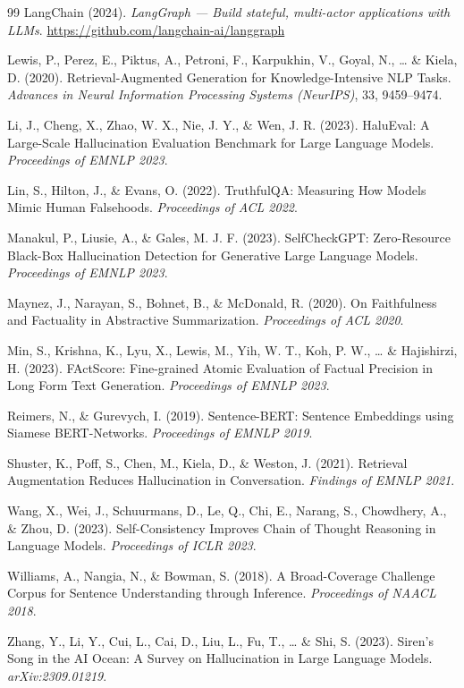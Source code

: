 \documentclass[12pt,a4paper]{article}
\begin{document}
\begin{thebibliography}{99}
LangChain (2024).
\newblock \textit{LangGraph --- Build stateful, multi-actor applications with LLMs}.
\newblock \url{https://github.com/langchain-ai/langgraph}

Lewis, P., Perez, E., Piktus, A., Petroni, F., Karpukhin, V., Goyal, N., \ldots{} \& Kiela, D. (2020).
\newblock Retrieval-Augmented Generation for Knowledge-Intensive NLP Tasks.
\newblock \textit{Advances in Neural Information Processing Systems (NeurIPS)}, 33, 9459--9474.

Li, J., Cheng, X., Zhao, W. X., Nie, J. Y., \& Wen, J. R. (2023).
\newblock HaluEval: A Large-Scale Hallucination Evaluation Benchmark for Large Language Models.
\newblock \textit{Proceedings of EMNLP 2023}.

Lin, S., Hilton, J., \& Evans, O. (2022).
\newblock TruthfulQA: Measuring How Models Mimic Human Falsehoods.
\newblock \textit{Proceedings of ACL 2022}.

Manakul, P., Liusie, A., \& Gales, M. J. F. (2023).
\newblock SelfCheckGPT: Zero-Resource Black-Box Hallucination Detection for Generative Large Language Models.
\newblock \textit{Proceedings of EMNLP 2023}.

Maynez, J., Narayan, S., Bohnet, B., \& McDonald, R. (2020).
\newblock On Faithfulness and Factuality in Abstractive Summarization.
\newblock \textit{Proceedings of ACL 2020}.

Min, S., Krishna, K., Lyu, X., Lewis, M., Yih, W. T., Koh, P. W., \ldots{} \& Hajishirzi, H. (2023).
\newblock FActScore: Fine-grained Atomic Evaluation of Factual Precision in Long Form Text Generation.
\newblock \textit{Proceedings of EMNLP 2023}.

Reimers, N., \& Gurevych, I. (2019).
\newblock Sentence-BERT: Sentence Embeddings using Siamese BERT-Networks.
\newblock \textit{Proceedings of EMNLP 2019}.

Shuster, K., Poff, S., Chen, M., Kiela, D., \& Weston, J. (2021).
\newblock Retrieval Augmentation Reduces Hallucination in Conversation.
\newblock \textit{Findings of EMNLP 2021}.

Wang, X., Wei, J., Schuurmans, D., Le, Q., Chi, E., Narang, S., Chowdhery, A., \& Zhou, D. (2023).
\newblock Self-Consistency Improves Chain of Thought Reasoning in Language Models.
\newblock \textit{Proceedings of ICLR 2023}.

Williams, A., Nangia, N., \& Bowman, S. (2018).
\newblock A Broad-Coverage Challenge Corpus for Sentence Understanding through Inference.
\newblock \textit{Proceedings of NAACL 2018}.

Zhang, Y., Li, Y., Cui, L., Cai, D., Liu, L., Fu, T., \ldots{} \& Shi, S. (2023).
\newblock Siren's Song in the AI Ocean: A Survey on Hallucination in Large Language Models.
\newblock \textit{arXiv:2309.01219}.

\end{thebibliography}
\end{document}
